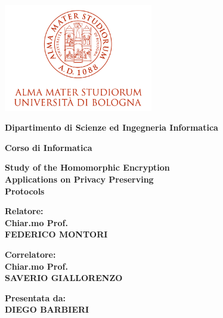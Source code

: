 \documentclass[12pt,a4paper,twoside]{book}
\begin{document}
\pagestyle{empty}

\begin{titlepage}

\begin{center}

\includegraphics[width=6.5cm,height=4.7cm]{img/marchio-di-ateneo.png}

\vspace{10mm}

{\large{\bf{Dipartimento di Scienze ed Ingegneria Informatica}}}

\vspace{5mm}

{\Large{\bf{Corso di Informatica}}}

\vspace{15mm}

{\Huge{\bf Study of the Homomorphic Encryption }}\\
\vspace{3mm}
{\Huge{\bf Applications on Privacy Preserving }}\\
\vspace{3mm}
{\Huge{\bf Protocols}} \\

\end{center}

\vspace{10mm}

\begin{minipage}[t]{0.50\textwidth}
{\large{\bf Relatore: \\ Chiar.mo Prof.\\ FEDERICO MONTORI}}

\vspace{3mm}

{\large{\bf Correlatore: \\ Chiar.mo Prof.\\ SAVERIO GIALLORENZO}}
\end{minipage}
\hfill
\begin{minipage}[t]{0.40\textwidth}\raggedleft
{\large{\bf Presentata da: \\ DIEGO BARBIERI}}
\end{minipage}


\end{titlepage}
\end{document}
